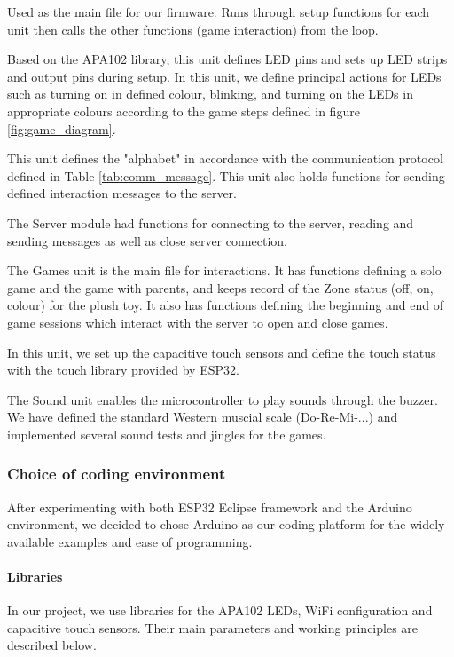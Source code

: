 \begin{description}[align=left]
\item  [NAPaC\_FW.ino] Used as the main file for our firmware. Runs through setup functions for each unit then calls the other functions (game interaction) from the loop. 
\item [LEDs.ino] Based on the APA102 library, this unit defines LED pins and sets up LED strips and output pins during setup. In this unit, we define principal actions for LEDs such as turning on in defined colour, blinking, and turning on the LEDs in appropriate colours according to the game steps defined in figure \ref{fig:game_diagram}.
\item[Messages.ino] This unit defines the "alphabet" in accordance with the communication protocol defined in Table \ref{tab:comm_message}. This unit also holds functions for sending defined interaction messages to the server.
\item[Server.ino] The Server module had functions for connecting to the server, reading and sending messages as well as close server connection. 
\item[Games.ino] The Games unit is the main file for interactions. It has functions defining a solo game and the game with parents, and keeps record of the Zone status (off, on, colour) for the plush toy. It also has functions defining the beginning and end of game sessions which interact with the server to open and close games.
\item[CapaSens.ino] In this unit, we set up the capacitive touch sensors and define the touch status with the touch library provided by ESP32. 
\item[Sound.ino] The Sound unit enables the microcontroller to play sounds through the buzzer. We have defined the standard Western muscial scale (Do-Re-Mi-...) and implemented several sound tests and jingles for the games. 
\end{description}



    \subsubsection{Choice of coding environment}
After experimenting with both ESP32 Eclipse framework and the Arduino environment, we decided to chose Arduino as our coding platform for the widely available examples and ease of programming.
    \paragraph{Libraries}
In our project, we use libraries for the APA102 LEDs, WiFi configuration and capacitive touch sensors. Their main parameters and working principles are described below. 
    
